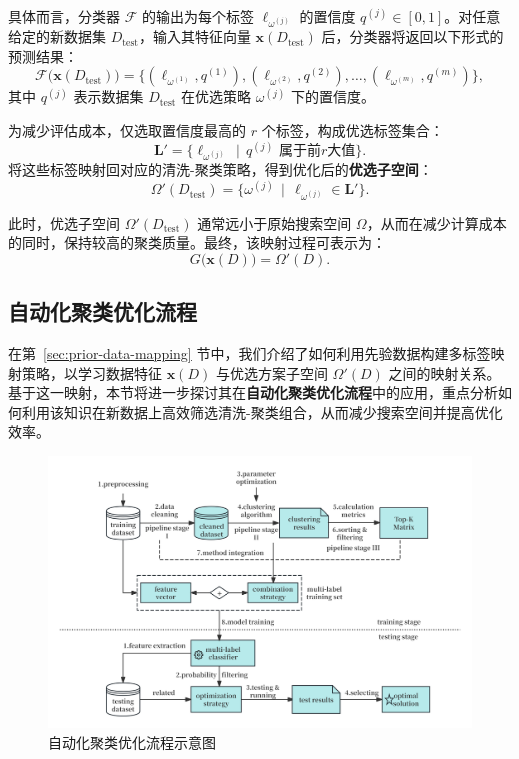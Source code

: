 \documentclass[10pt]{article} %
\numberwithin{equation}{section}
\begin{document}
具体而言，分类器 $\mathcal{F}$ 的输出为每个标签 $\ell_{\omega^{(j)}}$ 的置信度 $q^{(j)} \in [0,1]$。对任意给定的新数据集 $D_{\text{test}}$，输入其特征向量 $\mathbf{x}(D_{\text{test}})$ 后，分类器将返回以下形式的预测结果：
\begin{equation}\label{eq:classifier}
\mathcal{F}\bigl(\mathbf{x}(D_{\text{test}})\bigr)
= \bigl\{(\ell_{\omega^{(1)}}, q^{(1)}), (\ell_{\omega^{(2)}}, q^{(2)}), \ldots, (\ell_{\omega^{(m)}}, q^{(m)})\bigr\},
\end{equation}
其中 $q^{(j)}$ 表示数据集 $D_{\text{test}}$ 在优选策略 $\omega^{(j)}$ 下的置信度。

为减少评估成本，仅选取置信度最高的 $r$ 个标签，构成优选标签集合：
\begin{equation}\label{eq:predicted-label-space}
\mathbf{L}' = \bigl\{\ell_{\omega^{(j)}} \,\mid\, q^{(j)} \text{ 属于前}r\text{大值}\bigr\}.
\end{equation}
将这些标签映射回对应的清洗-聚类策略，得到优化后的\textbf{优选子空间}：
\begin{equation}\label{eq:optimized-space}
\Omega'(D_{\text{test}})
= \bigl\{\omega^{(j)} \,\mid\, \ell_{\omega^{(j)}} \in \mathbf{L}'\bigr\}.
\end{equation}

此时，优选子空间 $\Omega'(D_{\text{test}})$ 通常远小于原始搜索空间 $\Omega$，从而在减少计算成本的同时，保持较高的聚类质量。最终，该映射过程可表示为：
\begin{equation}\label{eq:mapping-function}
G\bigl(\mathbf{x}(D)\bigr) = \Omega'(D).
\end{equation}

\subsection{自动化聚类优化流程}
\label{sec:autocluster-process}

在第~\ref{sec:prior-data-mapping} 节中，我们介绍了如何利用先验数据构建多标签映射策略，以学习数据特征 $\mathbf{x}(D)$ 与优选方案子空间 $\Omega'(D)$ 之间的映射关系。基于这一映射，本节将进一步探讨其在\textbf{自动化聚类优化流程}中的应用，重点分析如何利用该知识在新数据上高效筛选清洗-聚类组合，从而减少搜索空间并提高优化效率。

\begin{figure}[htbp]
  \centering
  \includegraphics[width=0.85\linewidth]{figures/autocluster_workflow.png}
  \caption{自动化聚类优化流程示意图}
  \label{fig:autocluster-workflow}
\end{figure}
\end{document}
